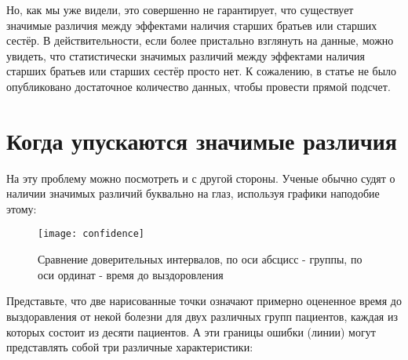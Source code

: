 Но, как мы уже видели, это совершенно не гарантирует, что существует значимые различия между эффектами наличия старших братьев или старших сестёр. В действительности, если более пристально взглянуть на данные, можно увидеть, что статистически значимых различий между эффектами наличия старших братьев или старших сестёр просто нет. К сожалению, в статье не было опубликовано достаточное количество данных, чтобы провести прямой подсчет.\cite{gelman_difference_2006}



\section{Когда упускаются значимые различия}
\label{chp6:significantdiffmissed}

На эту проблему можно посмотреть и с другой стороны. Ученые обычно судят о наличии значимых различий буквально на глаз, используя графики наподобие этому:



\newpage %

\begin{figure}[h!]
    \centering
    \texttt{[image: confidence]}
    \caption{Сравнение доверительных интервалов, по оси абсцисс - группы, по оси ординат - время до выздоровления}
    \label{fig5:confidence}
\end{figure}

Представьте, что две нарисованные точки означают примерно оцененное время до выздоравления от некой болезни для двух различных групп пациентов, каждая из которых состоит из десяти пациентов. А эти границы ошибки (линии) могут представлять собой три различные характеристики:

